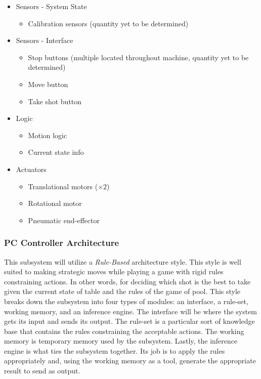 \documentclass[titlepage]{article}
\begin{document}
\begin{itemize}
	\item Sensors - System State
	\begin{itemize}
		\item Calibration sensors (quantity yet to be determined)
	\end{itemize}
	\item Sensors - Interface
	\begin{itemize}
		\item Stop buttons (multiple located throughout machine, quantity yet to be determined)
		\item Move button
		\item Take shot button
	\end{itemize}
	\item Logic
	\begin{itemize}
		\item Motion logic
		\item Current state info
	\end{itemize}
	\item Actuators
	\begin{itemize}
		\item Translational motors ($\times2$)
		\item Rotational motor
		\item Pneumatic end-effector
	\end{itemize}
\end{itemize}
\subsubsection{PC Controller Architecture}
This subsystem will utilize a \textit{Rule-Based} architecture style. This style is well suited to making strategic moves while playing a game with rigid rules constraining actions. In other words, for deciding which shot is the best to take given the current state of table and the rules of the game of pool. This style breaks down the subsystem into four types of modules: an interface, a rule-set,  working memory, and an inference engine. The interface will be where the system gets its input and sends its output. The rule-set is a particular sort of knowledge base that contains the rules constraining the acceptable actions. The working memory is temporary memory used by the subsystem. Lastly, the inference engine is what ties the subsystem together. Its job is to apply the rules appropriately and, using the working memory as a tool, generate the appropriate result to send as output.
\newpage 
\end{document}
